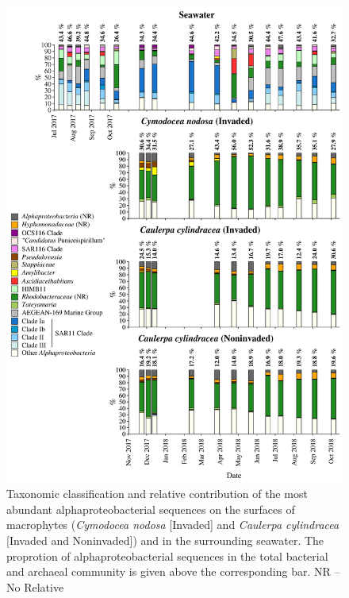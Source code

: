 \documentclass[12pt,]{article}
\begin{document}
\begin{figure}[H]

{\centering \includegraphics[width=0.85\linewidth]{../results/figures/alphaproteobacteria_bar_plot} 

}

\caption{Taxonomic classification and relative contribution of the most abundant alphaproteobacterial sequences on the surfaces of macrophytes (\textit{Cymodocea nodosa} [Invaded] and \textit{Caulerpa cylindracea} [Invaded and Noninvaded]) and in the surrounding seawater. The proprotion of alphaproteobacterial sequences in the total bacterial and archaeal community is given above the corresponding bar. NR -- No Relative\label{alpha}}\label{fig:unnamed-chunk-7}
\end{figure}
\end{document}
